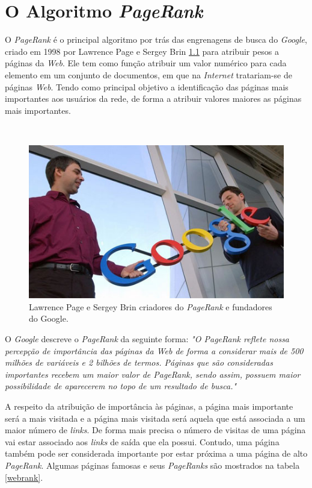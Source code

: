 \chapter{O Algoritmo \textit{PageRank}}%

O \textit{PageRank} é o principal algoritmo por trás das engrenagens de busca do \textit{Google}, criado em 1998 por Lawrence Page e Sergey Brin \ref{larry} para atribuir pesos a páginas da \textit{Web}. Ele tem como função atribuir um valor numérico para cada elemento em um conjunto de documentos, em que na \textit{Internet} tratariam-se de páginas \textit{Web}. Tendo como principal objetivo a identificação das páginas mais importantes aos usuários da rede, de forma a atribuir valores maiores as páginas mais importantes.

\
\begin{figure}[!htb]
	\centering
	\includegraphics[scale=0.45]{imagens/larry}
	\caption{Lawrence Page e Sergey Brin criadores do \textit{PageRank} e fundadores do Google.}
	\label{larry}
\end{figure}

O \textit{Google} descreve o \textit{PageRank} da seguinte forma: \textit{"O \textit{PageRank} reflete nossa percepção de importância das páginas da \textit{Web} de forma a considerar mais de 500 milhões de variáveis e 2 bilhões de termos. Páginas que são consideradas importantes recebem um maior valor de PageRank, sendo assim, possuem maior possibilidade de aparecerem no topo de um resultado de busca."} 

A respeito da atribuição de importância às páginas, a página mais importante será a mais visitada e a página mais visitada será aquela que está associada a um maior número de \textit{links}. De forma mais precisa o número de visitas de uma página vai estar associado aos \textit{links} de saída que ela possui. Contudo, uma página também pode ser considerada importante por estar próxima a uma página de alto \textit{PageRank}. Algumas páginas famosas e seus \textit{PageRanks} são mostrados na tabela \ref{webrank}.



